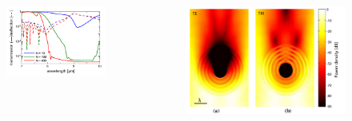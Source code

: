\documentclass{beamer}
\begin{document}
\begin{frame} [t]
\begin{columns}
\begin{column}{0.6\textwidth}
		\end{column}

	\end{columns}
		
\end{frame}


\begin{frame}
	\begin{columns}
			\begin{column}{0.5\textwidth}
			\begin{figure}
						\includegraphics[width=\textwidth]{../images/pml/oqe_trans_refl.png}
			\end{figure}
		\end{column}
		\begin{column}{0.5\textwidth}
			\begin{figure}
						\includegraphics[width=1.1\textwidth]{../images/pml/oqe_coreshell.png}
			\end{figure}
		\end{column}

	\end{columns}
		
\end{frame}
\end{document}
